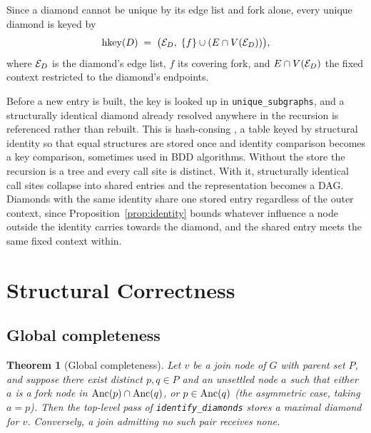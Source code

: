 \documentclass[12pt]{report}
\newtheorem{theorem}{Theorem}
\begin{document}
Since a diamond cannot be unique by its edge list and fork alone, every unique diamond is keyed by
\[
\mathrm{hkey}(D) \;=\; \bigl(\mathcal{E}_D,\; \{f\} \cup (E \cap V(\mathcal{E}_D))\bigr) ,
\]
where $\mathcal{E}_D$ is the diamond's edge list, $f$ its covering fork, and $E \cap V(\mathcal{E}_D)$ the fixed context restricted to the diamond's endpoints.

\label{sec:dd-hashconsing}
Before a new entry is built, the key is looked up in \texttt{unique\_subgraphs}, and a structurally identical diamond already resolved anywhere in the recursion is referenced rather than rebuilt. This is hash-consing \cite{ershov1958programming,filliatre2006hashconsing}, a table keyed by structural identity so that equal structures are stored once and identity comparison becomes a key comparison, sometimes used in BDD algorithms. Without the store the recursion is a tree and every call site is distinct. With it, structurally identical call sites collapse into shared entries and the representation becomes a DAG. Diamonds with the same identity share one stored entry regardless of the outer context, since Proposition~\ref{prop:identity} bounds whatever influence a node outside the identity carries towards the diamond, and the shared entry meets the same fixed context within.

\section{Structural Correctness}
\label{sec:dd-correctness}

\subsection{Global completeness}

\begin{theorem}[Global completeness]
\label{thm:completeness}
Let $v$ be a join node of $G$ with parent set $P$, and suppose there exist distinct $p, q \in P$ and an unsettled node $a$ such that either $a$ is a fork node in $\mathrm{Anc}(p)\cap\mathrm{Anc}(q)$, or $p \in \mathrm{Anc}(q)$ (the asymmetric case, taking $a = p$). Then the top-level pass of \texttt{identify\_diamonds} stores a maximal diamond for $v$. Conversely, a join admitting no such pair receives none.
\end{theorem}
\end{document}
